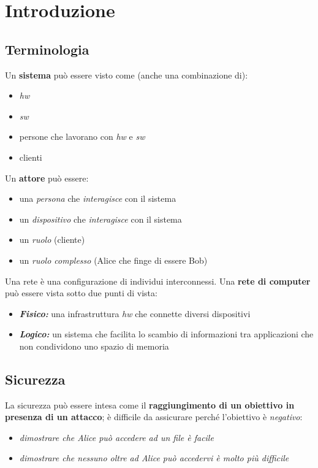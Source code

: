 \chapter{Introduzione}

\section{Terminologia}

Un \textbf{sistema} può essere visto come (anche una combinazione di):
\begin{itemize}
    \item \textit{hw}
    \item \textit{sw}
    \item persone che lavorano con \textit{hw} e \textit{sw}
    \item clienti
\end{itemize}

\noindent Un \textbf{attore} può essere:
\begin{itemize}
    \item una \textit{persona} che \textit{interagisce} con il sistema 
    \item un \textit{dispositivo} che \textit{interagisce} con il sistema 
    \item un \textit{ruolo} (cliente)
    \item un \textit{ruolo complesso} (Alice che finge di essere Bob)
\end{itemize}

\noindent Una rete è una configurazione di individui interconnessi. Una \textbf{rete di 
computer} può essere vista sotto due punti di vista:
\begin{itemize}
    \item \textit{\textbf{Fisico:}} una infrastruttura \textit{hw} che connette diversi dispositivi 
    \item \textit{\textbf{Logico:}} un sistema che facilita lo scambio di informazioni 
    tra applicazioni che non condividono uno spazio di memoria
\end{itemize}

\newpage
\section{Sicurezza}
La sicurezza può essere intesa come il \textbf{raggiungimento di un obiettivo in presenza 
di un attacco}; è difficile da assicurare perché l'obiettivo è \textit{negativo}:
\begin{itemize}
    \item \textit{dimostrare che Alice può accedere ad un file è facile}
    \item \textit{dimostrare che nessuno oltre ad Alice può accedervi è molto più 
    difficile}
\end{itemize}

